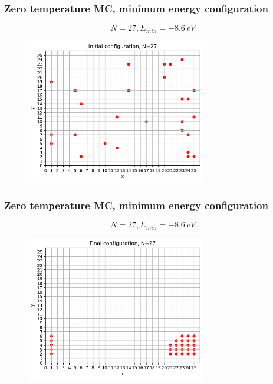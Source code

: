 \documentclass{beamer}
\begin{document}
\begin{frame}
    \frametitle{Zero temperature MC, minimum energy configuration}

    $$N=27, E_{min}= -8.6\,eV$$

    \begin{figure}
        \includegraphics[width=0.7\textwidth]{images/initconf27a.png}
    \end{figure}

\end{frame}

\begin{frame}
    \frametitle{Zero temperature MC, minimum energy configuration}

    $$N=27, E_{min}= -8.6\,eV$$

    \begin{figure}
        \includegraphics[width=0.7\textwidth]{images/finconf27a.png}
    \end{figure}

\end{frame}
\end{document}
